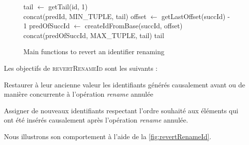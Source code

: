 \documentclass[12pt]{thesul}
\begin{document}
\begin{figure}[!ht]
\begin{algorithmic}
          \State tail $\gets$ getTail(id, 1)
          \\
              \State {}
              \State \Return concat(predId, MIN\_TUPLE, tail)
              \State {}
              \State offset $\gets$ getLastOffset(succId) - 1
              \State predOfSuccId $\gets$ createIdFromBase(succId, offset)
              \State \Return concat(predOfSuccId, MAX\_TUPLE, tail)
          \Else
              \State \Return tail
          \EndIf
      \EndFunction
  \end{algorithmic}
  \caption{Main functions to revert an identifier renaming}
  \label{alg:revertRenameId}
\end{figure}

Les objectifs de \textsc{revertRenameId} sont les suivants :
\begin{enumerate*}[label=(\roman*)]
  \item Restaurer à leur ancienne valeur les identifiants générés causalement avant ou de manière concurrente à l'opération \emph{rename} annulée
  \item Assigner de nouveaux identifiants respectant l'ordre souhaité aux éléments qui ont été insérés causalement après l'opération \emph{rename} annulée.
\end{enumerate*}
Nous illustrons son comportement à l'aide de la \autoref{fig:revertRenameId}.
\end{document}
